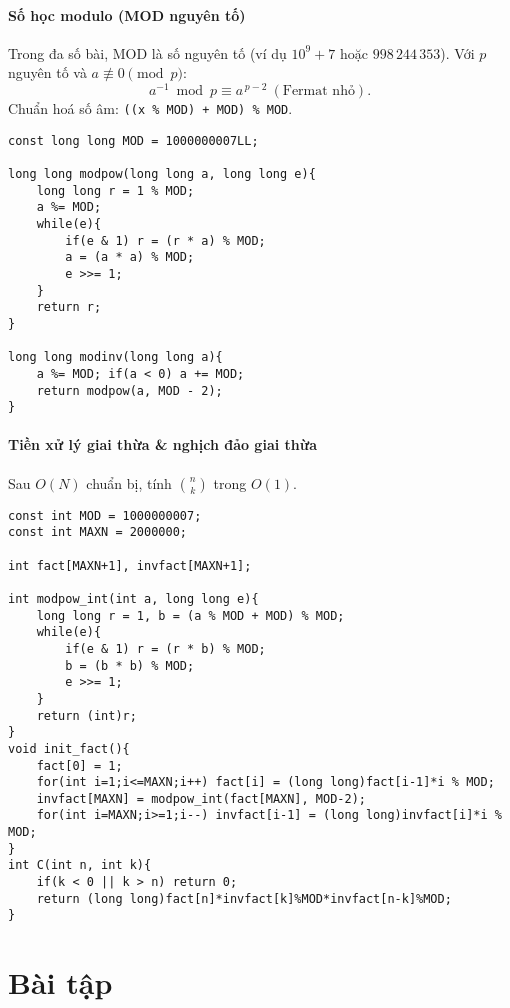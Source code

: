 \paragraph{Số học modulo (MOD nguyên tố)}
Trong đa số bài, MOD là số nguyên tố (ví dụ $10^9{+}7$ hoặc $998\,244\,353$). Với $p$ nguyên tố và $a\not\equiv 0\pmod p$:
\[
a^{-1}\bmod p \equiv a^{\,p-2}\ (\text{Fermat nhỏ}).
\]
Chuẩn hoá số âm: \texttt{((x \% MOD) + MOD) \% MOD}.

\begin{lstlisting}[caption={Lũy thừa nhanh và nghịch đảo modulo (C++)}]
const long long MOD = 1000000007LL;

long long modpow(long long a, long long e){
    long long r = 1 % MOD;
    a %= MOD;
    while(e){
        if(e & 1) r = (r * a) % MOD;
        a = (a * a) % MOD;
        e >>= 1;
    }
    return r;
}

long long modinv(long long a){
    a %= MOD; if(a < 0) a += MOD;
    return modpow(a, MOD - 2);
}
\end{lstlisting}

\paragraph{Tiền xử lý giai thừa \& nghịch đảo giai thừa}
Sau $O(N)$ chuẩn bị, tính $\binom{n}{k}$ trong $O(1)$.

\begin{lstlisting}[caption={Precompute factorial / invfactorial; tính C(n,k)}]
const int MOD = 1000000007;
const int MAXN = 2000000; 

int fact[MAXN+1], invfact[MAXN+1];

int modpow_int(int a, long long e){
    long long r = 1, b = (a % MOD + MOD) % MOD;
    while(e){
        if(e & 1) r = (r * b) % MOD;
        b = (b * b) % MOD;
        e >>= 1;
    }
    return (int)r;
}
void init_fact(){
    fact[0] = 1;
    for(int i=1;i<=MAXN;i++) fact[i] = (long long)fact[i-1]*i % MOD;
    invfact[MAXN] = modpow_int(fact[MAXN], MOD-2);
    for(int i=MAXN;i>=1;i--) invfact[i-1] = (long long)invfact[i]*i % MOD;
}
int C(int n, int k){
    if(k < 0 || k > n) return 0;
    return (long long)fact[n]*invfact[k]%MOD*invfact[n-k]%MOD;
}
\end{lstlisting}


\section{Bài tập}

